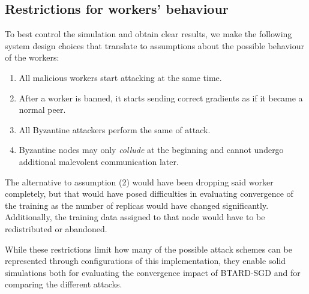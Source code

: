 \documentclass{article}
\begin{document}
\subsection{Restrictions for workers' behaviour}
To best control the simulation and obtain clear results, we make the following system design choices that translate to assumptions about the possible behaviour of the workers:
\begin{enumerate}
    \item All malicious workers start attacking at the same time. 
    \item After a worker is banned, it starts sending correct gradients as if it became a normal peer.
    \item All Byzantine attackers perform the same of attack.
    \item Byzantine nodes may only \textit{collude} at the beginning and cannot undergo additional malevolent communication later.
\end{enumerate}

The alternative to assumption (2) would have been dropping said worker completely, but that would have posed difficulties in evaluating convergence of the training as the number of replicas would have changed significantly. Additionally, the training data assigned to that node would have to be redistributed or abandoned.

While these restrictions limit how many of the possible attack schemes can be represented through configurations of this implementation, they enable solid simulations both for evaluating the convergence impact of BTARD-SGD and for comparing the different attacks.
\end{document}
